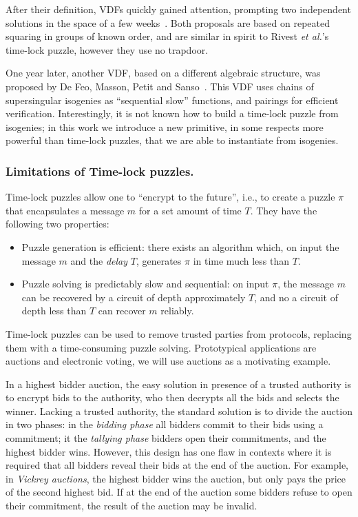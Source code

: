\documentclass{llncs}
\begin{document}
After their definition, VDFs quickly gained attention, prompting two
independent solutions in the space of a few
weeks~\cite{Wesolowski,Pietrzak}. %
Both proposals are based on repeated squaring in groups of known
order, and are similar in spirit to Rivest \emph{et al.}'s time-lock
puzzle, however they use no trapdoor.

One year later, another VDF, based on a different algebraic structure,
was proposed by De Feo, Masson, Petit and
Sanso~\cite{10.1007/978-3-030-34578-5_10}. %
This VDF uses chains of supersingular isogenies as ``sequential slow''
functions, and pairings for efficient verification. %
Interestingly, it is not known how to build a time-lock puzzle from
isogenies; in this work we introduce a new primitive, in some respects
more powerful than time-lock puzzles, that we are able to instantiate
from isogenies.

\subsubsection{Limitations of Time-lock puzzles.}
Time-lock puzzles allow one to ``encrypt to the future'', i.e., to
create a puzzle $\pi$ that encapsulates a message $m$ for a set amount
of time $T$. %
They have the following two properties:
\begin{itemize}
\item Puzzle generation is efficient: there exists an algorithm which,
  on input the message $m$ and the \emph{delay} $T$, generates $\pi$
  in time much less than $T$.
\item Puzzle solving is predictably slow and sequential: on input
  $\pi$, the message $m$ can be recovered by a circuit of depth
  approximately $T$, and no a circuit of depth less than $T$ can
  recover $m$ reliably.
\end{itemize}

Time-lock puzzles can be used to remove trusted parties from
protocols, replacing them with a time-consuming puzzle solving. %
Prototypical applications are auctions and electronic voting, we will
use auctions as a motivating example.

In a highest bidder auction, the easy solution in presence of a
trusted authority is to encrypt bids to the authority, who then
decrypts all the bids and selects the winner. %
Lacking a trusted authority, the standard solution is to divide the
auction in two phases: in the \emph{bidding phase} all bidders commit
to their bids using a commitment; it the \emph{tallying phase} bidders
open their commitments, and the highest bidder wins. %
However, this design has one flaw in contexts where it is required
that all bidders reveal their bids at the end of the auction. %
For example, in \emph{Vickrey auctions}, the highest bidder wins the
auction, but only pays the price of the second highest bid. %
If at the end of the auction some bidders refuse to open their
commitment, the result of the auction may be invalid.
\end{document}

